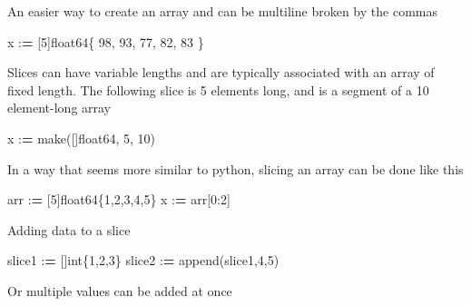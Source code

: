 \documentclass[]{book}
\newenvironment{Shaded}{\begin{snugshade}}{\end{snugshade}}
\newcommand{\DecValTok}[1]{\textcolor[rgb]{0.00,0.00,0.81}{#1}}
\newcommand{\OperatorTok}[1]{\textcolor[rgb]{0.81,0.36,0.00}{\textbf{#1}}}
\newcommand{\BuiltInTok}[1]{#1}
\newcommand{\NormalTok}[1]{#1}
\begin{document}
An easier way to create an array and can be multiline broken by the
commas

\begin{Shaded}
\begin{Highlighting}[]
\NormalTok{x :}\OperatorTok{=}\NormalTok{ [}\DecValTok{5}\NormalTok{]float64\{ }\DecValTok{98}\NormalTok{, }\DecValTok{93}\NormalTok{, }\DecValTok{77}\NormalTok{, }\DecValTok{82}\NormalTok{, }\DecValTok{83}\NormalTok{ \}}
\end{Highlighting}
\end{Shaded}

Slices can have variable lengths and are typically associated with an
array of fixed length. The following slice is 5 elements long, and is a
segment of a 10 element-long array

\begin{Shaded}
\begin{Highlighting}[]
\NormalTok{x :}\OperatorTok{=}\NormalTok{ make([]float64, }\DecValTok{5}\NormalTok{, }\DecValTok{10}\NormalTok{)}
\end{Highlighting}
\end{Shaded}

In a way that seems more similar to python, slicing an array can be done
like this

\begin{Shaded}
\begin{Highlighting}[]
\NormalTok{arr :}\OperatorTok{=}\NormalTok{ [}\DecValTok{5}\NormalTok{]float64\{}\DecValTok{1}\NormalTok{,}\DecValTok{2}\NormalTok{,}\DecValTok{3}\NormalTok{,}\DecValTok{4}\NormalTok{,}\DecValTok{5}\NormalTok{\}}
\NormalTok{x :}\OperatorTok{=}\NormalTok{ arr[}\DecValTok{0}\NormalTok{:}\DecValTok{2}\NormalTok{]}
\end{Highlighting}
\end{Shaded}

Adding data to a slice

\begin{Shaded}
\begin{Highlighting}[]
\NormalTok{slice1 :}\OperatorTok{=}\NormalTok{ []}\BuiltInTok{int}\NormalTok{\{}\DecValTok{1}\NormalTok{,}\DecValTok{2}\NormalTok{,}\DecValTok{3}\NormalTok{\}}
\NormalTok{slice2 :}\OperatorTok{=}\NormalTok{ append(slice1,}\DecValTok{4}\NormalTok{,}\DecValTok{5}\NormalTok{)}
\end{Highlighting}
\end{Shaded}

Or multiple values can be added at once
\end{document}
